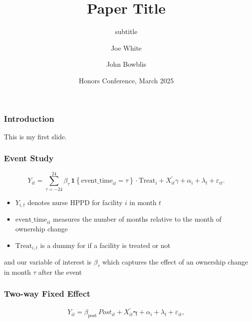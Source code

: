 \documentclass{beamer}
\title[About Beamer] %
{Paper Title}
\subtitle{subtitle}
\author[Joe White] %
{Joe White\inst{1} \and John Bowblis\inst{2}}
\institute[VFU] %
{
  \inst{1}%
  Department of Economics\\
  Miami University
  \and
  \inst{2}%
  Department of Economics\\
  Miami University
}
\date[VLC 2021] %
{Honors Conference, March 2025}
\begin{document}
\begin{frame}
  \titlepage
\end{frame}

\begin{frame}
  \frametitle{Introduction}
  This is my first slide.
\end{frame}

\begin{frame}
\frametitle{Event Study}
\begin{equation}
\label{eq:es_twfe}
Y_{it}
=
\sum_{\tau = -24}^{24}
    \beta_{\tau}\,
    \mathbf{1}\!\left\{ \text{event\_time}_{it} = \tau \right\}
    \cdot \text{Treat}_{i}
+
X_{it}^{\prime}\gamma
+
\alpha_i
+
\lambda_t
+
\varepsilon_{it}.
\end{equation}

\begin{itemize}
\item $Y_{i,t}$ denotes nurse HPPD for facility $i$ in month $t$
\item $\text{event\_time}_{it}$ measures the number of months relative to the month of ownership change
\item $\text{Treat}_{i,t}$ is a dummy for if a facility is treated or not
\end{itemize}

and our variable of interest is $\beta_{\tau}$ which captures the effect of an ownership change in month $\tau$ after the event
\end{frame}

\begin{frame}
\frametitle{Two-way Fixed Effect}
\begin{equation}
  Y_{it}
  =
  \beta_{\text{post}}\,\textit{Post}_{it}
  +
  X_{it}^{\prime}\boldsymbol{\gamma}
  +
  \alpha_i
  +
  \lambda_t
  +
  \varepsilon_{it},
  \label{eq:twfe-post}
\end{equation}
\end{frame}
\end{document}
